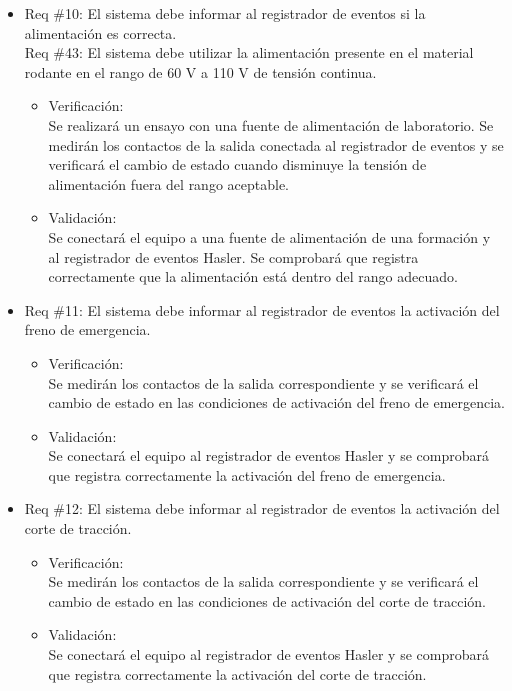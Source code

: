 \documentclass[11pt]{charter}
\begin{document}
\begin{itemize}
\item Req \#10: El sistema debe informar al registrador de eventos si la alimentación es correcta. \\
Req \#43: El sistema debe utilizar la alimentación presente en el material rodante en el rango de 60 V a 110 V de tensión continua.
\begin{itemize}
  \item Verificación:\\
  Se realizará un ensayo con una fuente de alimentación de laboratorio.
  Se medirán los contactos de la salida conectada al registrador de eventos y se verificará el cambio de estado cuando disminuye la tensión de alimentación fuera del rango aceptable.
  \item Validación:\\
  Se conectará el equipo a una fuente de alimentación de una formación y al registrador de eventos Hasler.
  Se comprobará que registra correctamente que la alimentación está dentro del rango adecuado.
\end{itemize}

\newpage

\item Req \#11: El sistema debe informar al registrador de eventos la activación del freno de emergencia.
\begin{itemize}
  \item Verificación:\\
  Se medirán los contactos de la salida correspondiente y se verificará el cambio de estado en las condiciones de activación del freno de emergencia.
  \item Validación:\\
  Se conectará el equipo al registrador de eventos Hasler y se comprobará que registra correctamente la activación del freno de emergencia.
\end{itemize}

\item Req \#12: El sistema debe informar al registrador de eventos la activación del corte de tracción.
\begin{itemize}
  \item Verificación:\\
  Se medirán los contactos de la salida correspondiente y se verificará el cambio de estado en las condiciones de activación del corte de tracción.
  \item Validación:\\
  Se conectará el equipo al registrador de eventos Hasler y se comprobará que registra correctamente la activación del corte de tracción.
\end{itemize}


\end{itemize}
\end{document}
